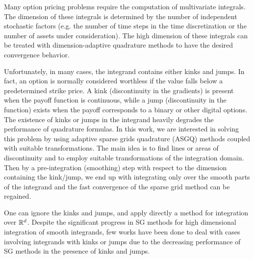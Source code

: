 Many option pricing problems  require the computation of multivariate integrals. The dimension of these integrals
is determined by the number of independent stochastic factors (e.g. the number of time steps in the time discretization or the number of assets under consideration).  The high dimension of these integrals can be treated with dimension-adaptive quadrature methods to have the desired convergence behavior.

Unfortunately, in many cases, the  integrand contains either kinks and jumps. In fact, an option is normally considered worthless if the value falls below a predetermined strike price.  A kink  (discontinuity in the gradients) is present when the payoff function is  continuous, while a jump (discontinuity in the function)  exists when the payoff corresponds to a binary or other digital options. The existence of kinks or jumps in the integrand  heavily degrades
the performance of quadrature formulas.  In this work, we are interested in solving this problem  by using adaptive  sparse grids quadrature (ASGQ) methods coupled with suitable transformations. The main idea is to find lines or areas of discontinuity and to employ suitable transformations of the integration domain. Then  by a pre-integration (smoothing) step with respect to the dimension containing the kink/jump,  we end up with integrating  only over the smooth parts of the integrand and the fast convergence of the sparse grid method can be regained.

One can ignore the kinks and jumps, and apply directly a method for integration over $\mathbb{R}^d$.  Despite the  significant progress in SG methods \cite{bungartz2004sparse} for high dimensional integration  of  smooth integrands, few works have been done to deal with  cases involving integrands with kinks or jumps due to the decreasing performance of SG methods in the presence of kinks and jumps. 

